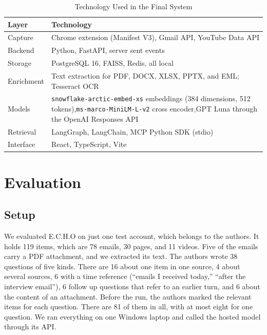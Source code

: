 \documentclass[conference]{IEEEtran}
\newcommand{\embmodel}{\texttt{snowflake\allowbreak-arctic\allowbreak-embed\allowbreak-xs}}
\newcommand{\embdim}{384}
\newcommand{\rerankmodel}{\texttt{ms\allowbreak-marco\allowbreak-MiniLM\allowbreak-L\allowbreak-6\allowbreak-v2}}
\newcommand{\llmname}{GPT\nobreakdash-6 Luna}
\begin{document}
\begin{table}[t]
\caption{Technology Used in the Final System}
\label{tab:stack}
\centering
\renewcommand{\arraystretch}{1.05}
\begin{tabular}{|>{\raggedright\arraybackslash}p{1.6cm}|>{\raggedright\arraybackslash}p{5.95cm}|}
\hline
\textbf{Layer} & \textbf{Technology} \\
\hline
Capture & Chrome extension (Manifest V3), Gmail API, YouTube Data API \\
\hline
Backend & Python, FastAPI, server sent events \\
\hline
Storage & PostgreSQL 16, FAISS, Redis, all local \\
\hline
Enrichment & Text extraction for PDF, DOCX, XLSX, PPTX, and EML; Tesseract OCR \\
\hline
Models & \embmodel{} embeddings (\embdim{} dimensions, 512 tokens),\newline \rerankmodel{} cross encoder,\newline \llmname{} through the OpenAI Responses API \\
\hline
Retrieval & LangGraph, LangChain, MCP Python SDK (stdio) \\
\hline
Interface & React, TypeScript, Vite \\
\hline
\end{tabular}
\end{table}

\section{Evaluation}\label{sec:eval}
\subsection{Setup}
We evaluated E.C.H.O on just one test account, which belongs to the authors. It holds 119 items, which are 78 emails, 30 pages, and 11 videos. Five of the emails carry a PDF attachment, and we extracted its text. The authors wrote 38 questions of five kinds. There are 16 about one item in one source, 4 about several sources, 6 with a time reference (``emails I received today,'' ``after the interview email''), 6 follow up questions that refer to an earlier turn, and 6 about the content of an attachment. Before the run, the authors marked the relevant items for each question. There are 81 of them in all, with at most eight for one question. We ran everything on one Windows laptop and called the hosted model through its API.
\end{document}
